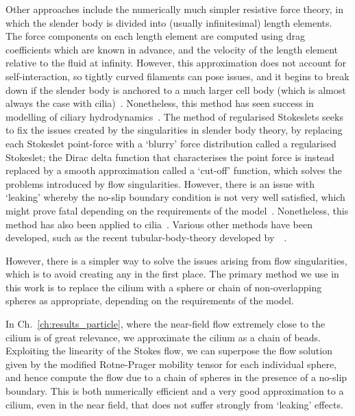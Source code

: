 Other approaches include the numerically much simpler resistive force theory, in which the slender body is divided into (usually infinitesimal) length elements. The force components on each length element are computed using drag coefficients which are known in advance, and the velocity of the length element relative to the fluid at infinity. However, this approximation does not account for self-interaction, so tightly curved filaments can pose issues, and it begins to break down if the slender body is anchored to a much larger cell body (which is almost always the case with cilia)~. Nonetheless, this method has seen success in modelling of ciliary hydrodynamics~. The method of regularised Stokeslets seeks to fix the issues created by the singularities in slender body theory, by replacing each Stokeslet point-force with a `blurry' force distribution called a regularised Stokeslet; the Dirac delta function that characterises the point force is instead replaced by a smooth approximation called a `cut-off' function, which solves the problems introduced by flow singularities. However, there is an issue with `leaking' whereby the no-slip boundary condition is not very well satisfied, which might prove fatal depending on the requirements of the model~. Nonetheless, this method has also been applied to cilia~. Various other methods have been developed, such as the recent tubular-body-theory developed by~\citeauthor*{koens_tubular-body_2022}~.


However, there is a simpler way to solve the issues arising from flow singularities, which is to avoid creating any in the first place. The primary method we use in this work is to replace the cilium with a sphere or chain of non-overlapping spheres as appropriate, depending on the requirements of the model. 

In Ch.~\ref{ch:results_particle}, where the near-field flow extremely close to the cilium is of great relevance, we approximate the cilium as a chain of beads. Exploiting the linearity of the Stokes flow, we can superpose the flow solution given by the modified Rotne-Prager mobility tensor for each individual sphere, and hence compute the flow due to a chain of spheres in the presence of a no-slip boundary. This is both numerically efficient and a very good approximation to a cilium, even in the near field, that does not suffer strongly from `leaking' effects. 

